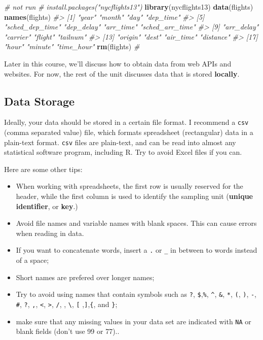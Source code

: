 \documentclass[]{book}
\newenvironment{Shaded}{\begin{snugshade}}{\end{snugshade}}
\newcommand{\CommentTok}[1]{\textcolor[rgb]{0.56,0.35,0.01}{\textit{#1}}}
\newcommand{\KeywordTok}[1]{\textcolor[rgb]{0.13,0.29,0.53}{\textbf{#1}}}
\newcommand{\NormalTok}[1]{#1}
\providecommand{\tightlist}{%
  \setlength{\itemsep}{0pt}\setlength{\parskip}{0pt}}
\begin{document}
\begin{Shaded}
\begin{Highlighting}[]
\CommentTok{# not run}
\CommentTok{# install.packages("nycflights13")}
\KeywordTok{library}\NormalTok{(nycflights13)}
\KeywordTok{data}\NormalTok{(flights)}
\KeywordTok{names}\NormalTok{(flights)}
\CommentTok{#>  [1] "year"           "month"          "day"            "dep_time"      }
\CommentTok{#>  [5] "sched_dep_time" "dep_delay"      "arr_time"       "sched_arr_time"}
\CommentTok{#>  [9] "arr_delay"      "carrier"        "flight"         "tailnum"       }
\CommentTok{#> [13] "origin"         "dest"           "air_time"       "distance"      }
\CommentTok{#> [17] "hour"           "minute"         "time_hour"}
\KeywordTok{rm}\NormalTok{(flights)}
\CommentTok{# }
\end{Highlighting}
\end{Shaded}

Later in this course, we'll discuss how to obtain data from web APIs and websites. For now, the rest of the unit discusses data that is stored \textbf{locally}.

\hypertarget{data-storage}{%
\subsection{Data Storage}\label{data-storage}}

Ideally, your data should be stored in a certain file format. I recommend a \texttt{csv} (comma separated value) file, which formats spreadsheet (rectangular) data in a plain-text format. \texttt{csv} files are plain-text, and can be read into almost any statistical software program, including R. Try to avoid Excel files if you can.

Here are some other tips:

\begin{itemize}
\tightlist
\item
  When working with spreadsheets, the first row is usually reserved for the header, while the first column is used to identify the sampling unit (\textbf{unique identifier}, or \textbf{key}.)
\item
  Avoid file names and variable names with blank spaces. This can cause errors when reading in data.
\item
  If you want to concatenate words, insert a \texttt{.} or \texttt{\_} in between to words instead of a space;
\item
  Short names are prefered over longer names;
\item
  Try to avoid using names that contain symbols such as \texttt{?}, \texttt{\$},\texttt{\%}, \texttt{\^{}}, \texttt{\&}, \texttt{*}, \texttt{(}, \texttt{)}, \texttt{-}, \texttt{\#}, \texttt{?}, \texttt{,}, \texttt{\textless{}}, \texttt{\textgreater{}}, \texttt{/}, \texttt{\textbar{}}, \texttt{\textbackslash{}}, \texttt{{[}} ,\texttt{{]}},\texttt{\{}, and \texttt{\}};
\item
  make sure that any missing values in your data set are indicated with \texttt{NA} or blank fields (don't use 99 or 77)..
\end{itemize}
\end{document}
